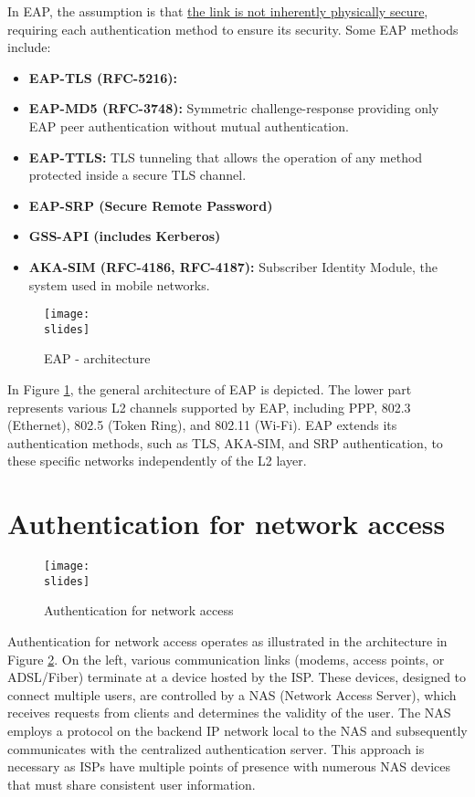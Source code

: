 In EAP, the assumption is that \underline{the link is not inherently physically secure}, requiring each authentication method to ensure its security. Some EAP methods include:
\begin{itemize}
    \item \textbf{EAP-TLS (RFC-5216):}
    \item \textbf{EAP-MD5 (RFC-3748):} Symmetric challenge-response providing only EAP peer authentication without mutual authentication.
    \item \textbf{EAP-TTLS:} TLS tunneling that allows the operation of any method protected inside a secure TLS channel.
    \item \textbf{EAP-SRP (Secure Remote Password)}
    \item \textbf{GSS-API (includes Kerberos)}
    \item \textbf{AKA-SIM (RFC-4186, RFC-4187):} Subscriber Identity Module, the system used in mobile networks.
\end{itemize}

\begin{figure}[h]
    \centering
    \texttt{[image: \\slides]}
    \caption{EAP - architecture}
    \label{fig:eap-architecture}
\end{figure}

In Figure \ref*{fig:eap-architecture}, the general architecture of EAP is depicted. The lower part represents various L2 channels supported by EAP, including PPP, 802.3 (Ethernet), 802.5 (Token Ring), and 802.11 (Wi-Fi). EAP extends its authentication methods, such as TLS, AKA-SIM, and SRP authentication, to these specific networks independently of the L2 layer.

\section{Authentication for network access}
\begin{figure}[h]
    \centering
    \texttt{[image: \\slides]}
    \caption{Authentication for network access}
    \label{fig:eap-authentication}
\end{figure}

Authentication for network access operates as illustrated in the architecture in Figure \ref{fig:eap-authentication}. On the left, various communication links (modems, access points, or ADSL/Fiber) terminate at a device hosted by the ISP. These devices, designed to connect multiple users, are controlled by a NAS (Network Access Server), which receives requests from clients and determines the validity of the user. The NAS employs a protocol on the backend IP network local to the NAS and subsequently communicates with the centralized authentication server. This approach is necessary as ISPs have multiple points of presence with numerous NAS devices that must share consistent user information.

